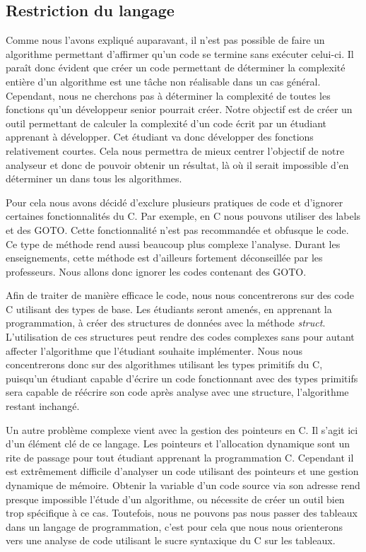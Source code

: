 \documentclass[12pt, twoside, openright]{report}
\begin{document}
\subsection{Restriction du langage}

Comme nous l'avons expliqué auparavant, il n'est pas possible de faire un algorithme permettant d'affirmer qu'un code se termine sans exécuter celui-ci. Il paraît donc évident que créer un code permettant de déterminer la complexité entière d'un algorithme est une tâche non réalisable dans un cas général. Cependant, nous ne cherchons pas à déterminer la complexité de toutes les fonctions qu'un développeur senior pourrait créer. Notre objectif est de créer un outil permettant de calculer la complexité d'un code écrit par un étudiant apprenant à développer. Cet étudiant va donc développer des fonctions relativement courtes. Cela nous permettra de mieux centrer l'objectif de notre analyseur et donc de pouvoir obtenir un résultat, là où il serait impossible d'en déterminer un dans tous les algorithmes.

Pour cela nous avons décidé d'exclure plusieurs pratiques de code et d'ignorer certaines fonctionnalités du C. Par exemple, en C nous pouvons utiliser des labels et des GOTO. Cette fonctionnalité n'est pas recommandée et obfusque le code. Ce type de méthode rend aussi beaucoup plus complexe l'analyse. Durant les enseignements, cette méthode est d'ailleurs fortement déconseillée par les professeurs. Nous allons donc ignorer les codes contenant des GOTO.

Afin de traiter de manière efficace le code, nous nous concentrerons sur des code C utilisant des types de base. Les étudiants seront amenés, en apprenant la programmation, à créer des structures de données avec la méthode \textit{struct}. L'utilisation de ces structures peut rendre des codes complexes sans pour autant affecter l'algorithme que l'étudiant souhaite implémenter. Nous nous concentrerons donc sur des algorithmes utilisant les types primitifs du C, puisqu'un étudiant capable d'écrire un code fonctionnant avec des types primitifs sera capable de réécrire son code après analyse avec une structure, l'algorithme restant inchangé. 

Un autre problème complexe vient avec la gestion des pointeurs en C. Il s'agit ici d'un élément clé de ce langage. Les pointeurs et l'allocation dynamique sont un rite de passage pour tout étudiant apprenant la programmation C. Cependant il est extrêmement difficile d'analyser un code utilisant des pointeurs et une gestion dynamique de mémoire. Obtenir la variable d'un code source via son adresse rend presque impossible l'étude d'un algorithme, ou nécessite de créer un outil bien trop spécifique à ce cas. Toutefois, nous ne pouvons pas nous passer des tableaux dans un langage de programmation, c'est pour cela que nous nous orienterons vers une analyse de code utilisant le sucre syntaxique du C sur les tableaux.
\end{document}
